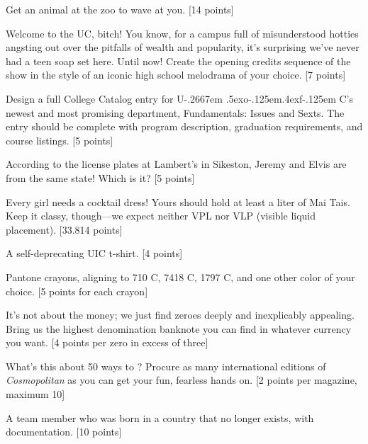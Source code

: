 \documentclass{book}
\def\UofC{U\kern-.2667em \lower.5ex\hbox{o}\kern-.125em\raise.4ex\hbox{f}\kern-.125em C}
\begin{document}
\begin{list}{}{}
\item Get an animal at the zoo to wave at you. [14 points]


\newpage



\item Welcome to the UC, bitch! You know, for a campus full of misunderstood hotties angsting out over the pitfalls of wealth and popularity, it's surprising we've never had a teen soap set here. Until now! Create the opening credits sequence of the show in the style of an iconic high school melodrama of your choice. [7 points]

\item Design a full College Catalog entry for \UofC's newest and most promising department, Fundamentals: Issues and Sexts. The entry should be complete with program description, graduation requirements, and course listings. [5 points]

\item According to the license plates at Lambert's in Sikeston, Jeremy and Elvis are from the same state! Which is it? [5 points]

\item Every girl needs a cocktail dress! Yours should hold at least a liter of Mai Tais. Keep it classy, though---we expect neither VPL nor VLP (visible liquid placement). [33.814 points]

\item A self-deprecating UIC t-shirt. [4 points]

\item Pantone crayons, aligning to 710 C, 7418 C, 1797 C, and one other color of your choice. [5 points for each crayon]

\item It's not about the money; we just find zeroes deeply and inexplicably appealing. Bring us the highest denomination banknote you can find in whatever currency you want. [4 points per zero in excess of three]

\item What's this about 50 ways to \large  {} \normalsize {} \large {}\normalsize {}? Procure as many international editions of \emph{Cosmopolitan} as you can get your fun, fearless hands on. [2 points per magazine, maximum 10] 

\item A team member who was born in a country that no longer exists, with documentation. [10 points]


\end{list}
\end{document}
